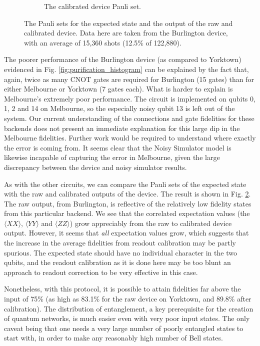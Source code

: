\begin{figure}[h!]
\begin{subfigure}{.5\textwidth}
		\caption{The calibrated device Pauli set.}
		\label{fig:pur_pauli_cal}
	\end{subfigure}
	\caption{The Pauli sets for the expected state and the output of the raw and
    calibrated device. Data here are taken from the Burlington device, with an
    average of 15,360 shots (12.5\% of 122,880).}
	\label{fig:purification_paulis}
\end{figure}

The poorer performance of the Burlington device (as compared to Yorktown)
evidenced in Fig. \ref{fig:purification_histogram} can be explained by the fact
that, again, twice as many CNOT gates are required for Burlington (15 gates)
than for either Melbourne or Yorktown (7 gates each). What is harder to explain
is Melbourne's extremely poor performance. The circuit is implemented on qubits
0, 1, 2 and 14 on Melbourne, so the especially noisy qubit 13 is left out of the
system. Our current understanding of the connections and gate fidelities for
these backends does not present an immediate explanation for this large dip in
the Melbourne fidelities. Further work would be required to understand where
exactly the error is coming from. It seems clear that the Noisy Simulator model
is likewise incapable of capturing the error in Melbourne, given the large
discrepancy between the device and noisy simulator results.

As with the other circuits, we can compare the Pauli sets of the expected state
with the raw and calibrated outputs of the device. The result is shown in Fig.
\ref{fig:purification_paulis}. The raw output, from Burlington, is reflective of
the relatively low fidelity states from this particular backend. We see that the
correlated expectation values (the $\langle XX \rangle$, $\langle YY \rangle$
and $\langle ZZ \rangle$) grow appreciably from the raw to calibrated device
output. However, it seems that \textit{all} expectation values grow, which
suggests that the increase in the average fidelities from readout calibration
may be partly spurious. The expected state should have no individual character
in the two qubits, and the readout calibration as it is done here may be too
blunt an approach to readout correction to be very effective in this case.

Nonetheless, with this protocol, it is possible to attain fidelities far above
the input of 75\% (as high as 83.1\% for the raw device on Yorktown, and 89.8\%
after calibration). The distribution of entanglement, a key prerequisite for the
creation of quantum networks, is much easier even with very poor input states.
The only caveat being that one needs a very large number of poorly entangled
states to start with, in order to make any reasonably high number of Bell states.

